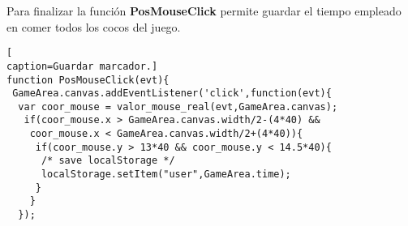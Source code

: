 Para finalizar la función \textbf{PosMouseClick} permite guardar el tiempo empleado en comer todos los cocos del juego.
\begin{lstlisting}[
caption=Guardar marcador.]
function PosMouseClick(evt){
 GameArea.canvas.addEventListener('click',function(evt){
  var coor_mouse = valor_mouse_real(evt,GameArea.canvas);
   if(coor_mouse.x > GameArea.canvas.width/2-(4*40) && 
    coor_mouse.x < GameArea.canvas.width/2+(4*40)){
     if(coor_mouse.y > 13*40 && coor_mouse.y < 14.5*40){
      /* save localStorage */
      localStorage.setItem("user",GameArea.time);
     }
    }
  });
\end{lstlisting}